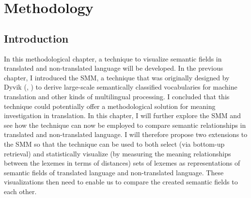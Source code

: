 \chapter{Methodology}
\label{sec:3}

\section{Introduction}
\label{sec:3.1}  
In this methodological chapter, a technique to visualize semantic fields in translated and non-translated language will be developed. In the previous chapter, I introduced the SMM, a technique that was originally designed by Dyvik (\citep{johansson_translational_1998}, \citep{langemets_translations_2005}) to derive large-scale semantically classified vocabularies for machine translation and other kinds of multilingual processing. I concluded that this technique could potentially offer a methodological solution for meaning investigation in translation. In this chapter, I will further explore the SMM and see how the technique can now be employed to compare semantic relationships in translated and non-translated language. I will therefore propose two extensions to the SMM so that the technique can be used to both select (via bottom-up retrieval) and statistically visualize (by measuring the meaning relationships between the lexemes in terms of distances) sets of lexemes as representations of semantic fields of translated language and non-translated language. These visualizations then need to enable us to compare the created semantic fields to each other.

